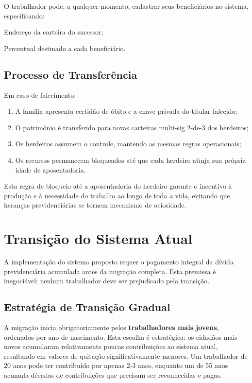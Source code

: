 O trabalhador pode, a qualquer momento, cadastrar seus beneficiários no sistema, especificando:

\begin{alineas}
    \item Endereço da carteira do sucessor;
    \item Percentual destinado a cada beneficiário.
\end{alineas}

\subsection{Processo de Transferência}

Em caso de falecimento:

\begin{enumerate}
    \item A família apresenta certidão de óbito e a chave privada do titular falecido;
    \item O patrimônio é transferido para novas carteiras multi-sig 2-de-3 dos herdeiros;
    \item Os herdeiros assumem o controle, mantendo as mesmas regras operacionais;
    \item Os recursos permanecem bloqueados até que cada herdeiro atinja sua própria idade de aposentadoria.
\end{enumerate}

Esta regra de bloqueio até a aposentadoria do herdeiro garante o incentivo à produção e à necessidade do trabalho ao longo de toda a vida, evitando que heranças previdenciárias se tornem mecanismo de ociosidade.

\section{Transição do Sistema Atual}

A implementação do sistema proposto requer o pagamento integral da dívida previdenciária acumulada antes da migração completa. Esta premissa é inegociável: nenhum trabalhador deve ser prejudicado pela transição.

\subsection{Estratégia de Transição Gradual}

A migração inicia obrigatoriamente pelos \textbf{trabalhadores mais jovens}, ordenados por ano de nascimento. Esta escolha é estratégica: os cidadãos mais novos acumularam relativamente poucas contribuições ao sistema atual, resultando em valores de quitação significativamente menores. Um trabalhador de 20 anos pode ter contribuído por apenas 2-3 anos, enquanto um de 55 anos acumula décadas de contribuições que precisam ser reconhecidas e pagas.

